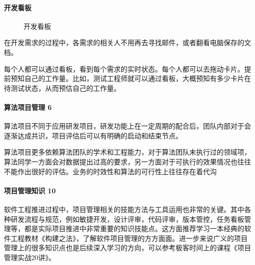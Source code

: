 \documentclass[letterpaper,11pt,english]{sphinxmanual}
\begin{document}
\paragraph{开发看板}
\label{\detokenize{chapter_knowledge/project_manage:id10}}
\begin{figure}[H]
\centering
\capstart

\noindent{}
\caption{开发看板\sphinxfootnotemark[564]}\label{\detokenize{chapter_knowledge/project_manage:id22}}\end{figure}
%
\begin{footnotetext}[564]\sphinxAtStartFootnote
{}
%
\end{footnotetext}\ignorespaces 
在开发需求的过程中，各需求的相关人不用再去寻找邮件，或者翻看电脑保存的文档。

每个人都可以通过看板，看到每个需求的实时状态。每个人都可以去拖动卡片。提前预知自己的工作量。比如，测试工程师就可以通过看板，大概预知有多少卡片在待测试状态，从而预估自己的工作量。


\paragraph{算法项目管理 6\sphinxfootnotemark[565]}
\label{\detokenize{chapter_knowledge/project_manage:id11}}%
\begin{footnotetext}[565]\sphinxAtStartFootnote
{}
%
\end{footnotetext}\ignorespaces 
算法项目不同于应用研发项目，研发功能上在一定周期的配合后，团队内部对于会逐渐达成共识，项目评估后可以有明确的启动和结束节点。

算法项目更多依赖算法团队的学术和工程能力，对于算法团队未执行过的领域项，算法同学一方面会对数据提出过高的要求，另一方面对于可执行的效果情况也往往不能作出很好的评估。业务的时效性和算法的可行性上往往存在着代沟


\paragraph{项目管理知识 10\sphinxfootnotemark[566]}
\label{\detokenize{chapter_knowledge/project_manage:id12}}%
\begin{footnotetext}[566]\sphinxAtStartFootnote
{}
%
\end{footnotetext}\ignorespaces 
软件工程推进过程中，项目管理相关的技能方法与工具运用也非常的关键。其中各种研发流程与规范，例如敏捷开发，设计评审，代码评审，版本管控，任务看板管理等，都是实际项目推进中非常重要的知识技能点。这方面推荐学习一本经典的软件工程教材《构建之法》，了解软件项目管理的方方面面。进一步来说广义的项目管理上的很多知识点也是后续深入学习的方向，可以参考极客时间上的课程《项目管理实战20讲》。
\end{document}
